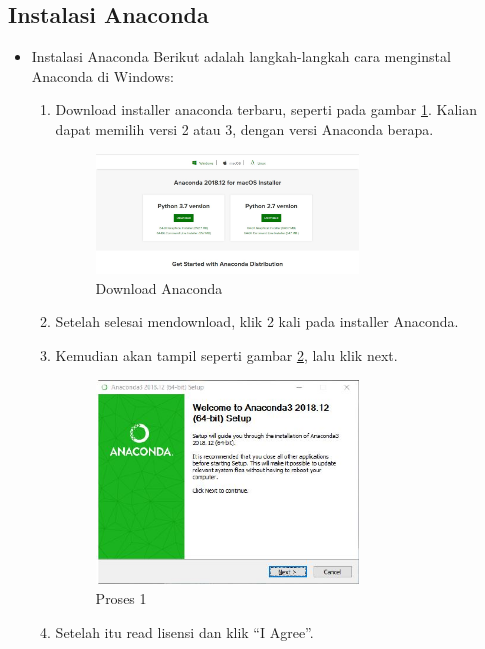 \subsection{Instalasi Anaconda}
\begin{itemize}
\item Instalasi Anaconda
Berikut adalah langkah-langkah cara menginstal Anaconda di Windows:
\begin{enumerate}
\item Download installer anaconda terbaru, seperti pada gambar \ref{downloadanaconda}. Kalian dapat memilih versi 2 atau 3, dengan versi Anaconda berapa.
\begin{figure}[ht]
	\centerline{\includegraphics[width=0.70\textwidth]{figures/Rahma/DownloadAnaconda.JPG}}
	\caption{Download Anaconda}
	\label{downloadanaconda}
\end{figure}	
\item Setelah selesai mendownload, klik 2 kali pada installer Anaconda.
\item Kemudian akan tampil seperti gambar \ref{gambar1}, lalu klik next.
\begin{figure}[ht]
	\centerline{\includegraphics[width=0.70\textwidth]{figures/Rahma/a.JPG}}
	\caption{Proses 1 }
	\label{gambar1}
\end{figure}
\item Setelah itu read lisensi dan klik “I Agree”.
\begin{figure}[ht]

\end{figure}
\end{enumerate}
\end{itemize}
